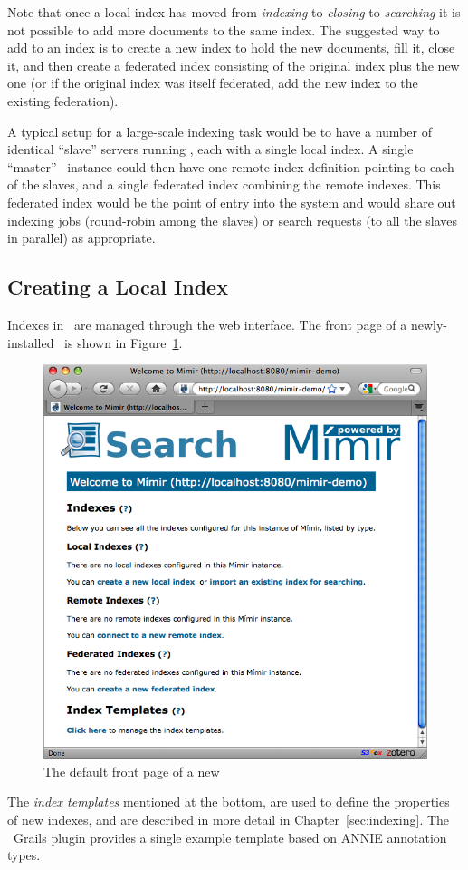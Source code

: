 Note that once a local index has moved from {\em indexing} to {\em closing} to
{\em searching} it is not possible to add more documents to the same index.
The suggested way to add to an index is to create a new index to hold the new
documents, fill it, close it, and then create a federated index consisting of
the original index plus the new one (or if the original index was itself
federated, add the new index to the existing federation).

A typical setup for a large-scale indexing task would be to have a number of
identical ``slave'' servers running \Mimir, each with a single local index.  A
single ``master'' \Mimir\ instance could then have one remote index definition
pointing to each of the slaves, and a single federated index combining the
remote indexes.  This federated index would be the point of entry into the
system and would share out indexing jobs (round-robin among the slaves) or
search requests (to all the slaves in parallel) as appropriate.

\subsection{Creating a Local Index}

Indexes in \Mimir\ are managed through the web interface.  The front page of a
newly-installed \Mimir\ is shown in Figure~\ref{fig:front-page}.
%
\begin{figure}[htb!]
\begin{center}
\includegraphics[scale=0.5]{img/default-front-page}
\end{center}
\caption{The default front page of a new \Mimir}
\label{fig:front-page}
\end{figure}
%
The {\em index templates} mentioned at the bottom, are used to define the
properties of new indexes, and are described in more detail in
Chapter~\ref{sec:indexing}.  The \Mimir\ Grails plugin provides a single
example template based on ANNIE annotation types.

